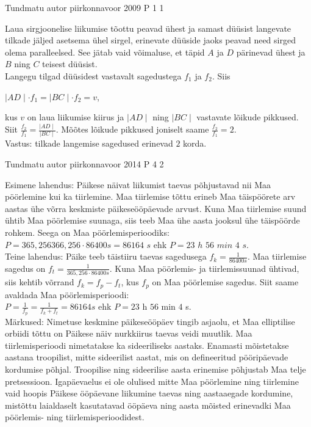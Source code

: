 \documentclass[11pt]{article}
\begin{document}
{%
{Tundmatu autor} %
{piirkonnavoor} %
{2009} %
{P 1} %
{1} %
{

\ifSolution
Laua sirgjoonelise liikumise tõottu peavad ühest ja samast düüsist langevate tilkade jäljed asetsema ühel sirgel, erinevate düüside jaoks peavad need sirged olema paralleelsed. See jätab vaid võimaluse, et täpid $A$ ja $D$ pärinevad ühest ja $B$ ning $C$ teisest düüsist. \\
Langegu tilgad düüsidest vastavalt sagedustega $f_1$ ja $f_2$. Siis 
\begin{center}
$\mid AD \mid \cdot f_1 = \mid BC \mid \cdot f_2 = v$,
\end{center}
kus $v$ on laua liikumise kiirus ja $ \mid AD \mid$ ning $\mid BC \mid$ vastavate lõikude pikkused. Siit $\frac{f_2}{f_1} = \frac{\mid AD\mid}{\mid BC \mid}$. Mõõtes lõikude pikkused joniselt saame $\frac{f_2}{f_1} = 2$. \\
Vastus: tilkade langemise sagedused erinevad $2$ korda.
\fi
}

{Tundmatu autor} %
{piirkonnavoor} %
{2014} %
{P 4} %
{2} %
{

\ifSolution
Esimene lahendus: Päikese näivat liikumist taevas põhjustavad nii Maa pöörlemine kui ka tiirlemine. Maa tiirlemise tõttu erineb Maa täispöörete arv aastas ühe võrra keskmiste päikeseööpäevade arvust. Kuna Maa tiirlemise suund ühtib Maa pöörlemise suunaga, siis teeb Maa ühe aasta jooksul ühe täispöörde rohkem. Seega on Maa pöörlemisperioodiks: \\
$P=365,256366,256 \cdot 86 400 s =86 164$ $s$  ehk $P= 23$ $h$ $56$ $min$ $4$ $s$.\\
Teine lahendus: Päike teeb täistiiru taevas sagedusega $f_k=\frac{1}{86 400 s}$. Maa tiirlemise sagedus on $f_t = \frac{1}{365,256 \cdot 86400 s}$. Kuna Maa pöörlemis- ja tiirlemissuunad ühtivad, siis kehtib võrrand $f_k = f_p - f_t$, kus $f_p$ on Maa pöörlemise sagedus. Siit saame avaldada Maa pöörlemisperioodi: \\
$P=\frac{1}{f_p} = \frac{1}{f_k + f_t} = 86 164 s$ ehk $P= 23$ h $56$ min $4$ s.\\
Märkused: Nimetuse keskmine päikeseööpäev tingib asjaolu, et Maa elliptilise orbiidi tõttu on Päikese näiv nurkkiirus taevas veidi muutlik. Maa tiirlemisperioodi nimetatakse ka sideeriliseks aastaks. Enamasti mõistetakse aastana troopilist, mitte sideerilist aastat, mis on defineeritud pööripäevade kordumise põhjal. Troopilise ning sideerilise aasta erinemise põhjustab Maa telje pretsessioon. Igapäevaelus ei ole olulised mitte Maa pöörlemine ning tiirlemine vaid hoopis Päikese ööpäevane liikumine taevas ning aastaaegade kordumine, mistõttu laialdaselt kasutatavad ööpäeva ning aasta mõisted erinevadki Maa pöörlemis- ning tiirlemisperioodidest.
\fi
}

}
\end{document}
